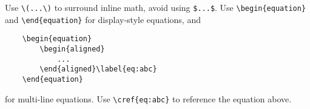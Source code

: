 Use \verb|\(...\)| to surround inline math,
avoid using \verb|$...$|.
Use \verb|\begin{equation}| and \verb|\end{equation}|
for display-style equations,
and
\begin{verbatim}
    \begin{equation}
        \begin{aligned}
            ...
        \end{aligned}\label{eq:abc}
    \end{equation}
\end{verbatim}
for multi-line equations.
Use \verb|\cref{eq:abc}| to reference the equation above.
